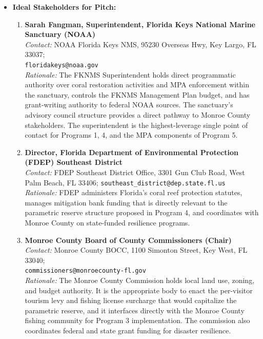 \documentclass[10pt,letterpaper]{article}
\newcounter{metric}
\begin{document}
\begin{itemize}

    \item \textbf{Ideal Stakeholders for Pitch:}

    \begin{enumerate}

        \item \textbf{Sarah Fangman, Superintendent, Florida Keys National Marine Sanctuary (NOAA)}\\
        \textit{Contact:} NOAA Florida Keys NMS, 95230 Overseas Hwy, Key Largo, FL 33037;\\ \texttt{floridakeys@noaa.gov}\\
        \textit{Rationale:} The FKNMS Superintendent holds direct programmatic authority over coral restoration activities and MPA enforcement within the sanctuary, controls the FKNMS Management Plan budget, and has grant-writing authority to federal NOAA sources. The sanctuary's advisory council structure provides a direct pathway to Monroe County stakeholders. The superintendent is the highest-leverage single point of contact for Programs 1, 4, and the MPA components of Program 5.

        \item \textbf{Director, Florida Department of Environmental Protection (FDEP) Southeast District}\\
        \textit{Contact:} FDEP Southeast District Office, 3301 Gun Club Road, West Palm Beach, FL 33406; \texttt{southeast\_district@dep.state.fl.us}\\
        \textit{Rationale:} FDEP administers Florida's coral reef protection statutes, manages mitigation bank funding that is directly relevant to the parametric reserve structure proposed in Program 4, and coordinates with Monroe County on state-funded resilience programs. 

        \item \textbf{Monroe County Board of County Commissioners (Chair)}\\
        \textit{Contact:} Monroe County BOCC, 1100 Simonton Street, Key West, FL 33040;\\ \texttt{commissioners@monroecounty-fl.gov}\\
        \textit{Rationale:} The Monroe County Commission holds local land use, zoning, and budget authority. It is the appropriate body to enact the per-visitor tourism levy and fishing license surcharge that would capitalize the parametric reserve, and it interfaces directly with the Monroe County fishing community for Program 3 implementation. The commission also coordinates federal and state grant funding for disaster resilience.


\end{enumerate}
\end{itemize}
\end{document}
